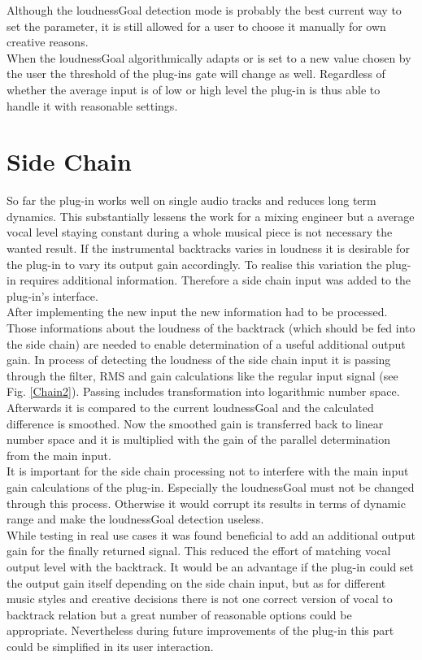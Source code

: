 Although the loudnessGoal detection mode is probably the best current way to set the parameter, it is still allowed for a user to choose it manually for own creative reasons.\\
When the loudnessGoal algorithmically adapts or is set to a new value chosen by the user the threshold of the plug-ins gate will change as well. Regardless of whether the average input is of low or high level the plug-in is thus able to handle it with reasonable settings.\\

\section{Side Chain}

So far the plug-in works well on single audio tracks and reduces long term dynamics. This substantially lessens the work for a mixing engineer but a average vocal level staying constant during a whole musical piece is not necessary the wanted result. If the instrumental backtracks varies in loudness it is desirable for the plug-in to vary its output gain accordingly. To realise this variation the plug-in requires additional information. Therefore a side chain input was added to the plug-in's interface.\\
After implementing the new input the new information had to be processed. Those informations about the loudness of the backtrack (which should be fed into the side chain) are needed to enable determination of a useful additional output gain. In process of detecting the loudness of the side chain input it is passing through the filter, RMS and gain calculations like the regular input signal (see Fig. \ref{Chain2}). Passing includes transformation into logarithmic number space. Afterwards it is compared to the current loudnessGoal and the calculated difference is smoothed. Now the smoothed gain is transferred back to linear number space and it is multiplied with the gain of the parallel determination from the main input.\\
It is important for the side chain processing not to interfere with the main input gain calculations of the plug-in. Especially the loudnessGoal must not be changed through this process. Otherwise it would corrupt its results in terms of dynamic range and make the loudnessGoal detection useless.\\
While testing in real use cases it was found beneficial to add an additional output gain for the finally returned signal. This reduced the effort of matching vocal output level with the backtrack. It would be an advantage if the plug-in could set the output gain itself depending on the side chain input, but as for different music styles and creative decisions there is not one correct version of vocal to backtrack relation but a great number of reasonable options could be appropriate. Nevertheless during future improvements of the plug-in this part could be simplified in its user interaction.\\
